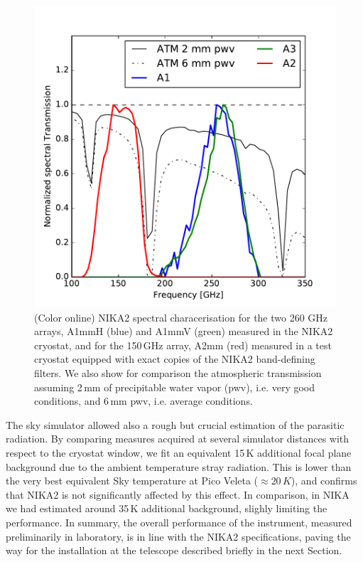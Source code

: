 \documentclass[]{aa} %
\begin{document}
\begin{figure}[h]
   \centering
    \includegraphics[width=1.0\linewidth]{atm_transmission.pdf}
      \caption{(Color online) NIKA2 spectral characerisation for the two 260 GHz arrays, A1mmH (blue) and A1mmV (green) measured in the NIKA2 cryostat, and for the 150\,GHz array, A2mm (red) measured in a test cryostat equipped with exact copies of the NIKA2 band-defining filters. We also show for comparison the atmospheric transmission assuming 2\,mm of precipitable water vapor (pwv), i.e. very good conditions, and 6\,mm pwv, i.e. average conditions.
         \label{Fig4}}
\end{figure}

The sky simulator allowed also a rough but crucial estimation of the parasitic radiation. By comparing measures acquired at several simulator distances with respect to the cryostat window, we fit an equivalent 15\,K additional focal plane background due to the ambient temperature stray radiation. This is lower than the very best equivalent Sky temperature at Pico Veleta ($\approx 20\,K$), and confirms that NIKA2 is not significantly affected by this effect. In comparison, in NIKA we had estimated around 35\,K additional background, slighly limiting the performance. 
In summary, the overall performance of the instrument, measured preliminarily in laboratory, is in line with the NIKA2 specifications, paving the way for the installation at the telescope described briefly in the next Section. 
\end{document}
